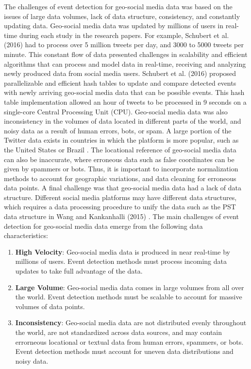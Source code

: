 The challenges of event detection for geo-social media data was based on the issues of large data volumes, lack of data structure, consistency, and constantly updating data. Geo-social media data was updated by millions of users in real-time during each study in the research papers. For example, Schubert et al. (2016) \cite{Schubert:2016} had to process over 5 million tweets per day, and 3000 to 5000 tweets per minute. This constant flow of data presented challenges in scalability and efficient algorithms that can process and model data in real-time, receiving and analyzing newly produced data from social media users. Schubert et al. (2016) \cite{Schubert:2016} proposed parallelizable and efficient hash tables to update and compare detected events with newly arriving geo-social media data that can be possible events. This hash table implementation allowed an hour of tweets to be processed in 9 seconds on a single-core Central Processing Unit (CPU). Geo-social media data was also inconsistency in the volumes of data located in different parts of the world, and noisy data as a result of human errors, bots, or spam. A large portion of the Twitter data exists in countries in which the platform is more popular, such as the United States or Brazil \cite{Schubert:2016}. The locational reference of geo-social media data can also be inaccurate, where erroneous data such as false coordinates can be given by spammers or bots. Thus, it is important to incorporate normalization methods to account for geographic variations, and data cleaning for erroneous data points. A final challenge was that geo-social media data had a lack of data structure. Different social media platforms may have different data structures, which requires a data processing procedure to unify the data such as the PST data structure in Wang and Kankanhalli (2015) \cite{Wang:2015}. The main challenges of event detection for geo-social media data emerge from the following data characteristics:

\begin{enumerate}[label=(\alph*)]
  \item \textbf{High Velocity}: Geo-social media data is produced in near real-time by millions of users. Event detection methods must process incoming data updates to take full advantage of the data.
  \item \textbf{Large Volume}: Geo-social media data comes in large volumes from all over the world. Event detection methods must be scalable to account for massive volumes of data points.
  \item \textbf{Inconsistency}:  Geo-social media data are not distributed evenly throughout the world, are not standardized across data sources, and may contain errorneous locational or textual data from human errors, spammers, or bots. Event detection methods must account for uneven data distributions and noisy data.
\end{enumerate}

